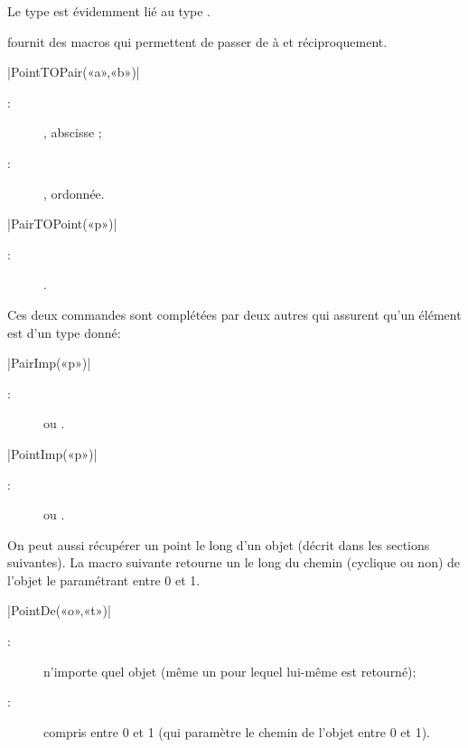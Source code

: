 \documentclass[a4paper,french]{article}
\begin{document}
Le type  est évidemment lié au type \MP{} .

\mpgeomdd fournit des macros qui permettent de passer de  à
 et réciproquement.
\begin{colourband}
\macro|PointTOPair(«a»,«b»)|
\begin{description}
  \item[:] , abscisse ;
  \item[:] , ordonnée.
\end{description}
\end{colourband}


\begin{colourband}
\macro|PairTOPoint(«p»)|
\begin{description}
  \item[:] .
\end{description}
\end{colourband}

Ces deux commandes sont complétées par deux autres qui assurent qu'un élément est
d'un type donné:
\begin{colourband}
\macro|PairImp(«p»)|
\begin{description}
  \item[:]  ou .
\end{description}
\end{colourband}


\begin{colourband}
\macro|PointImp(«p»)|
\begin{description}
  \item[:]  ou .
\end{description}
\end{colourband}

On peut aussi récupérer un point le long d'un objet \mpgeomdd (décrit dans les
sections suivantes). La macro suivante retourne un  le long du
chemin (cyclique ou non) de l'objet le paramétrant entre 0 et 1.

\begin{colourband}
\macro|PointDe(«o»,«t»)|
\begin{description}
  \item[:] n'importe quel objet \mpgeomdd (même un  pour
  lequel lui-même est retourné);
  \item[:]  compris entre 0 et 1 (qui paramètre le
  chemin de l'objet entre 0 et 1).
\end{description}
\end{colourband}
\end{document}

